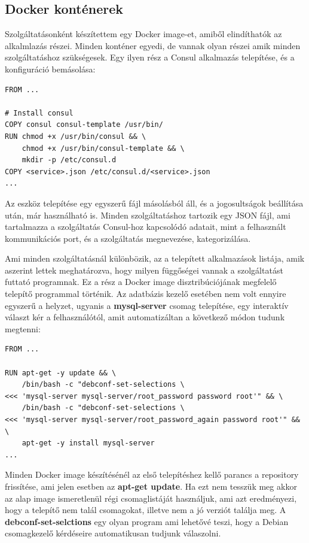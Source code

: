 \documentclass[11pt,magyar,a4paper,twoside,]{report}
\begin{document}
\subsection{Docker konténerek}\label{docker-kontuxe9nerek}

Szolgáltatásonként készítettem egy Docker image-et, amiből elindíthatók
az alkalmlazás részei. Minden konténer egyedi, de vannak olyan részei
amik minden szolgáltatáshoz szükségesek. Egy ilyen rész a Consul
alkalmazás telepítése, és a konfiguráció bemásolása:

\begin{verbatim}
FROM ...

# Install consul
COPY consul consul-template /usr/bin/
RUN chmod +x /usr/bin/consul && \
    chmod +x /usr/bin/consul-template && \
    mkdir -p /etc/consul.d
COPY <service>.json /etc/consul.d/<service>.json
...
\end{verbatim}

Az eszköz telepítése egy egyszerű fájl másolásból áll, és a
jogosultságok beállítása után, már használható is. Minden
szolgáltatáshoz tartozik egy JSON fájl, ami tartalmazza a szolgáltatás
Consul-hoz kapcsolódó adatait, mint a felhasznált kommunikációs port, és
a szolgáltatás megnevezése, kategorizálása.

Ami minden szolgáltatásnál különbözik, az a telepített alkalmazások
listája, amik aszerint lettek meghatározva, hogy milyen függőségei
vannak a szolgáltatást futtató programnak. Ez a rész a Docker image
disztribúciójának megfelelő telepítő programmal történik. Az adatbázis
kezelő esetében nem volt ennyire egyszerű a helyzet, ugyanis a
\textbf{mysql-server} csomag telepítése, egy interaktív választ kér a
felhasználótól, amit automatizáltan a következő módon tudunk megtenni:

\begin{verbatim}
FROM ...

RUN apt-get -y update && \
    /bin/bash -c "debconf-set-selections \
<<< 'mysql-server mysql-server/root_password password root'" && \
    /bin/bash -c "debconf-set-selections \
<<< 'mysql-server mysql-server/root_password_again password root'" && \
    apt-get -y install mysql-server
...
\end{verbatim}

Minden Docker image készítésénél az első telepítéshez kellő parancs a
repository frissítése, ami jelen esetben az \textbf{apt-get update}. Ha
ezt nem tesszük meg akkor az alap image ismeretlenül régi csomaglistáját
használjuk, ami azt eredményezi, hogy a telepítő nem talál csomagokat,
illetve nem a jó verziót találja meg. A \textbf{debconf-set-selctions}
egy olyan program ami lehetővé teszi, hogy a Debian csomagkezelő
kérdéseire automatikusan tudjunk válaszolni.
\end{document}

